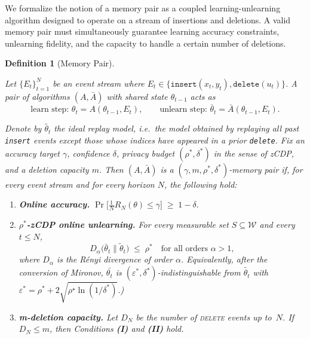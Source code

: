 \documentclass[a4paper,12pt]{article}
\newtheorem{definition}[theorem]{Definition}
\begin{document}
We formalize the notion of a memory pair as a coupled learning-unlearning algorithm designed to operate on a stream of insertions and deletions. A valid memory pair must simultaneously guarantee learning accuracy constraints, unlearning fidelity, and the capacity to handle a certain number of deletions.

\begin{definition}[Memory Pair]
\label{def:memory-pair}

Let $\{E_t\}_{t=1}^{N}$ be an event stream where $E_{t}\in \{\texttt{insert}(x_{t},y_{t}),\texttt{delete}(u_{t})\}$.  
A pair of algorithms $(A,\bar A)$ with shared state $\theta_{t-1}$ acts as
$$
\text{learn step: }\theta_t = A(\theta_{t-1},E_t),\qquad
\text{unlearn step: }\bar\theta_t = \bar A(\theta_{t-1},E_t).
$$

Denote by $\tilde{\theta_{t}}$ the {\it ideal replay model}, i.e.\ the model
obtained by replaying all past \texttt{insert} events except those whose
indices have appeared in a prior \texttt{delete}.  
Fix an accuracy target $\gamma$, confidence $\delta$, privacy budget
$(\rho^{*},\delta^{*})$ in the sense of zCDP, and a deletion capacity
$m$.  Then $(A,\bar A)$ is a
\emph{$(\gamma,m,\rho^{*},\delta^{*})$-memory pair} if, for every
event stream and for every horizon $N$, the following hold:

\begin{enumerate}
\item[\textbf{(I)}] \textbf{Online accuracy.}  
      \(
      \Pr\!\bigl[\tfrac1N R_N(\theta)\le\gamma\bigr]\;\ge\;1-\delta.
      \)

\item[\textbf{(II)}] \textbf{\(\rho^{*}\)-zCDP online unlearning.}  
      For every measurable set $S\subseteq\mathcal{W}$ and every
      $t\!\le\!N$,
      $$
        D_\alpha\!\bigl(\bar\theta_t\!\parallel\!\tilde\theta_t\bigr)
        \;\le\;\rho^{*}
        \quad\text{for all orders } \alpha>1,
      $$
      where $D_{\alpha}$ is the Rényi divergence of order $\alpha$. Equivalently, after the conversion of Mironov, $\bar{\theta_{t}}$ is $(\varepsilon^{*},\delta^{*})$-indistinguishable from $\tilde{\theta_{t}}$ with $\varepsilon^{*}=\rho^{*}+2\sqrt{\rho^{\star}\ln(1/\delta^{*})}$.)

\item[\textbf{(III)}] \textbf{m-deletion capacity.}  
      Let $D_N$ be the number of \textsc{delete} events up to~$N$.  
      If $D_N\le m$, then Conditions \textbf{(I)} and \textbf{(II)} hold.
\end{enumerate}
\end{definition}
\end{document}

